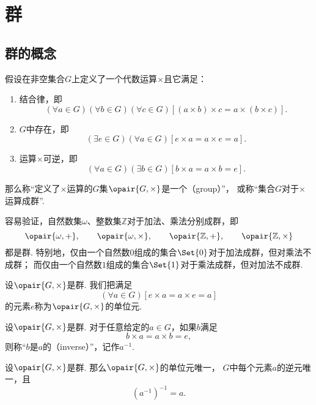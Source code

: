 \section{群}
\subsection{群的概念}
\begin{definition}
假设在非空集合\(G\)上定义了一个代数运算\(\times\)且它满足：
\begin{enumerate}
    \item 结合律，即\[
        (\forall a \in G)(\forall b \in G)(\forall c \in G)
        [(a \times b) \times c = a \times (b \times c)].
    \]

    \item \(G\)中存在，即\[
        (\exists e \in G)(\forall a \in G)
        [e \times a = a \times e = a].
    \]

    \item 运算\(\times\)可逆，即\[
        (\forall a \in G)(\exists b \in G)
        [b \times a = a \times b = e].
    \]
\end{enumerate}
那么称“定义了\(\times\)运算的\(G\)集\(\opair{G,\times}\)是一个（group）”，
或称“集合\(G\)对于\(\times\)运算成群”.
\end{definition}

容易验证，自然数集\(\omega\)、整数集\(\mathbb{Z}\)对于加法、乘法分别成群，即\[
	\opair{\omega,+}, \qquad
	\opair{\omega,\times}, \qquad
	\opair{\mathbb{Z},+}, \qquad
	\opair{\mathbb{Z},\times}
\]都是群.
特别地，仅由一个自然数\(0\)组成的集合\(\Set{0}\)对于加法成群，但对乘法不成群；
而仅由一个自然数\(1\)组成的集合\(\Set{1}\)对于乘法成群，但对加法不成群.

\begin{definition}
设\(\opair{G,\times}\)是群.
我们把满足\[
    (\forall a \in G)
    [e \times a = a \times e = a]
\]的元素\(e\)称为\(\opair{G,\times}\)的单位元.
\end{definition}

\begin{definition}
设\(\opair{G,\times}\)是群.
对于任意给定的\(a \in G\)，如果\(b\)满足\[
    b \times a = a \times b = e,
\]
则称“\(b\)是\(a\)的（inverse）”，记作\(a^{-1}\).
\end{definition}

\begin{property}
设\(\opair{G,\times}\)是群.
那么\(\opair{G,\times}\)的单位元唯一，
\(G\)中每个元素\(a\)的逆元唯一，且\[
    (a^{-1})^{-1} = a.
\]
\end{property}


